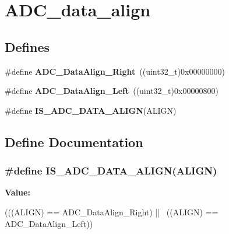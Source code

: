 \hypertarget{group__ADC__data__align}{
\section{ADC\_\-data\_\-align}
\label{group__ADC__data__align}
}
\subsection*{Defines}
\begin{DoxyCompactItemize}
\item 
\hypertarget{group__ADC__data__align_ga80b5d2f2b6b058bc498f58e0a92ad035}{
\#define {\bfseries ADC\_\-DataAlign\_\-Right}~((uint32\_\-t)0x00000000)}
\label{group__ADC__data__align_ga80b5d2f2b6b058bc498f58e0a92ad035}

\item 
\hypertarget{group__ADC__data__align_ga87c2b7021bc288174d5d6175dc267251}{
\#define {\bfseries ADC\_\-DataAlign\_\-Left}~((uint32\_\-t)0x00000800)}
\label{group__ADC__data__align_ga87c2b7021bc288174d5d6175dc267251}

\item 
\#define {\bfseries IS\_\-ADC\_\-DATA\_\-ALIGN}(ALIGN)
\end{DoxyCompactItemize}


\subsection{Define Documentation}
\hypertarget{group__ADC__data__align_ga2903b620e3c61dc47ed8c0fbf4197801}{
\subsubsection[{IS\_\-ADC\_\-DATA\_\-ALIGN}]{\setlength{\rightskip}{0pt plus 5cm}\#define IS\_\-ADC\_\-DATA\_\-ALIGN(ALIGN)}}
\label{group__ADC__data__align_ga2903b620e3c61dc47ed8c0fbf4197801}
{\bfseries Value:}
\begin{DoxyCode}
(((ALIGN) == ADC_DataAlign_Right) || \
                                  ((ALIGN) == ADC_DataAlign_Left))
\end{DoxyCode}
